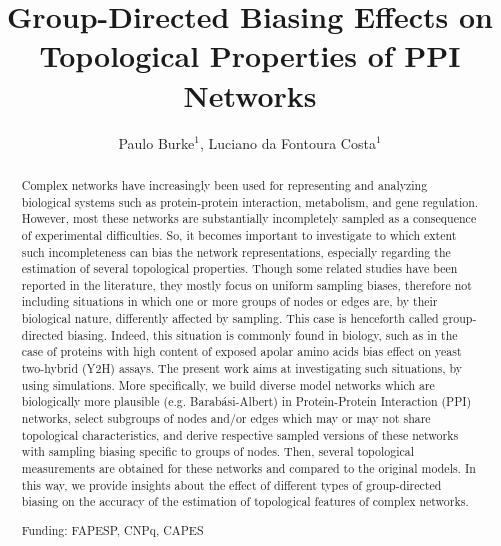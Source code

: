 \documentclass[twoside]{article}
\title{\vspace{-15mm}\fontsize{24pt}{10pt}\selectfont\textbf{Group-Directed Biasing Effects on Topological Properties of PPI Networks}} %
\author{Paulo Burke$^1$, Luciano da Fontoura Costa$^1$}
\affil{1 IFSC - USP\\ }
\date{}
\begin{document}
\maketitle %

\thispagestyle{fancy} %


\begin{abstract}
Complex networks have increasingly been used for representing and analyzing biological systems such as protein-protein interaction, metabolism, and gene regulation.  However, most these networks are substantially incompletely sampled as a consequence of experimental difficulties.  So, it becomes important to investigate to which extent such incompleteness can bias the network representations, especially regarding the estimation of several topological properties.  Though some related studies have been reported in the literature, they mostly focus on uniform sampling biases, therefore not including situations in which one or more groups of nodes or edges are, by their biological nature, differently affected by sampling.  This case is henceforth called group-directed biasing.  Indeed, this situation is commonly found in biology, such as in the case of proteins with high content of exposed apolar amino acids bias effect on yeast two-hybrid (Y2H) assays.  The present work aims at investigating such situations, by using simulations.  More specifically, we build diverse model networks which are biologically more plausible (e.g. Barab\'asi-Albert) in Protein-Protein Interaction (PPI) networks, select subgroups of nodes and/or edges which may or may not share topological characteristics, and derive respective sampled versions of these networks with sampling biasing specific to groups of nodes.  Then, several topological measurements are obtained for these networks and compared to the original models.  In this way, we provide insights about the effect of different types of group-directed biasing on the accuracy of the estimation of topological features of complex networks.

Funding: FAPESP, CNPq, CAPES
\end{abstract}
\end{document}
